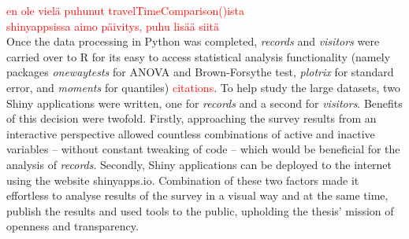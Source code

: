 \textcolor{red}{en ole vielä puhunut travelTimeComparison()ista} \\
\textcolor{red}{shinyappsissa aimo päivitys, puhu lisää siitä} \\
Once the data processing in Python was completed, \textit{records} and \textit{visitors} were carried over to R for its easy to access statistical analysis functionality (namely packages \textit{onewaytests} for ANOVA and Brown-Forsythe test, \textit{plotrix} for standard error, and \textit{moments} for quantiles) \textcolor{red}{citations}. To help study the large datasets, two Shiny applications were written, one for \textit{records} and a second for \textit{visitors}. Benefits of this decision were twofold. Firstly, approaching the survey results from an interactive perspective allowed countless combinations of active and inactive variables -- without constant tweaking of code -- which would be beneficial for the analysis of \textit{records}. Secondly, Shiny applications can be deployed to the internet using the website shinyapps.io. Combination of these two factors made it effortless to analyse results of the survey in a visual way and at the same time, publish the results and used tools to the public, upholding the thesis' mission of openness and transparency.

